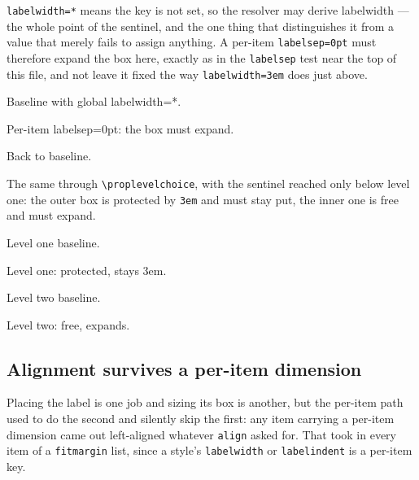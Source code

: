 \documentclass{article}
\newlength{\flabelwd}
\newcommand{\flabel}[1]{%
  \settowidth{\flabelwd}{\textbf{#1}}%
  \ifdim\flabelwd<\dimexpr\labelwidth-2\fboxsep-2\fboxrule\relax
    \setlength{\flabelwd}{\dimexpr\labelwidth-2\fboxsep-2\fboxrule\relax}%
  \fi
  \fbox{\makebox[\flabelwd]{\textbf{#1}\hfill}}}
\begin{document}
\verb|labelwidth=*| means the key is not set, so the resolver may derive
labelwidth --- the whole point of the sentinel, and the one thing that
distinguishes it from a value that merely fails to assign anything.  A
per-item \texttt{labelsep=0pt} must therefore expand the box here, exactly as
in the \texttt{labelsep} test near the top of this file, and not leave it fixed
the way \texttt{labelwidth=3em} does just above.

\begingroup
{}
\begin{prop}
  \item[name=\flabel{A}] Baseline with global labelwidth=*.
  \item[labelsep=0pt, name=\flabel{B}]
    Per-item labelsep=0pt: the box must expand.
  \item[name=\flabel{C}] Back to baseline.
\end{prop}
\endgroup

The same through \verb|\proplevelchoice|, with the sentinel reached only below
level one: the outer box is protected by \texttt{3em} and must stay put, the
inner one is free and must expand.

\begingroup
{}
\begin{prop}
  \item[name=\flabel{L1a}] Level one baseline.
  \item[labelsep=0pt, name=\flabel{L1b}] Level one: protected, stays 3em.
  \begin{prop}
    \item[name=\flabel{L2a}] Level two baseline.
    \item[labelsep=0pt, name=\flabel{L2b}] Level two: free, expands.
  \end{prop}
\end{prop}
\endgroup

\subsection{Alignment survives a per-item dimension}

Placing the label is one job and sizing its box is another, but the per-item
path used to do the second and silently skip the first: any item carrying a
per-item dimension came out left-aligned whatever \texttt{align} asked for.
That took in every item of a \texttt{fitmargin} list, since a style's
\texttt{labelwidth} or \texttt{labelindent} is a per-item key.
\end{document}
